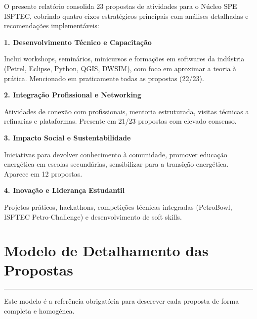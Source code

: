 \documentclass[12pt,a4paper]{article}
\begin{document}
O presente relatório consolida 23 propostas de atividades para o Núcleo SPE ISPTEC, cobrindo quatro eixos estratégicos principais com análises detalhadas e recomendações implementáveis:

\vspace{0.3cm}

\begin{infobox}
\small\bfseries\color{steelblue}1. Desenvolvimento Técnico e Capacitação
\end{infobox}
Inclui workshops, seminários, minicursos e formações em softwares da indústria (Petrel, Eclipse, Python, QGIS, DWSIM), com foco em aproximar a teoria à prática. Mencionado em praticamente todas as propostas (22/23).

\begin{infobox}
\small\bfseries\color{skyblue}2. Integração Profissional e Networking
\end{infobox}
Atividades de conexão com profissionais, mentoria estruturada, visitas técnicas a refinarias e plataformas. Presente em 21/23 propostas com elevado consenso.

\begin{infobox}
\small\bfseries\color{alertred}3. Impacto Social e Sustentabilidade
\end{infobox}
Iniciativas para devolver conhecimento à comunidade, promover educação energética em escolas secundárias, sensibilizar para a transição energética. Aparece em 12 propostas.

\begin{infobox}
\small\bfseries\color{navy}4. Inovação e Liderança Estudantil
\end{infobox}
Projetos práticos, hackathons, competições técnicas integradas (PetroBowl, ISPTEC Petro-Challenge) e desenvolvimento de soft skills.

\clearpage
\section*{Modelo de Detalhamento das Propostas}
\begin{center}{\color{gold}\rule{8cm}{0.6pt}}\end{center}
\vspace{0.2cm}

Este modelo é a referência obrigatória para descrever cada proposta de forma completa e homogénea.
\end{document}
